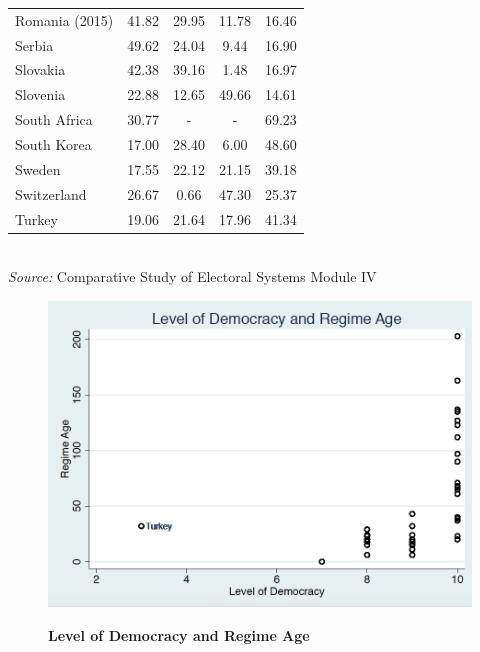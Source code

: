\documentclass[12pt, titlepage]{article}
\newcommand\e{\emph}
\newcommand\tb{\textbf}
\begin{document}
\begin{table}
\begin{tabulary}{\linewidth}{l c c c c}
		Romania (2015)&41.82&29.95&11.78&16.46 \\
		Serbia&49.62&24.04&9.44&16.90 \\
		Slovakia&42.38&39.16&1.48&16.97 \\
		Slovenia&22.88&12.65&49.66&14.61 \\
		South Africa&30.77&-&-&69.23 \\
		South Korea&17.00&28.40&6.00&48.60 \\
		Sweden&17.55&22.12&21.15&39.18 \\
		Switzerland&26.67&0.66&47.30&25.37 \\
		Turkey&19.06&21.64&17.96&41.34 \\
		\hline
	\end{tabulary} \\
\e{Source:} Comparative Study of Electoral Systems Module IV 
\label{table2}
\end{table}




\begin{figure}[ht!]    \centering
	{	 \includegraphics[width=\textwidth]{AgeDemPF}}
	\caption{\tb{Level of Democracy and Regime Age}}\label{figure2}
\end{figure}
\end{document}

